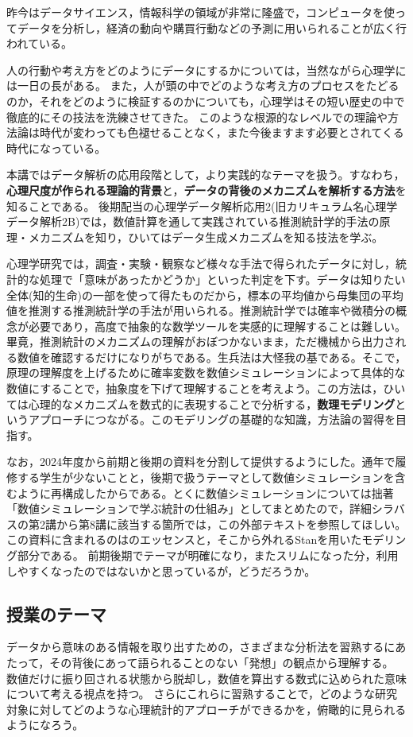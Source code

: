 昨今はデータサイエンス，情報科学の領域が非常に隆盛で，コンピュータを使ってデータを分析し，経済の動向や購買行動などの予測に用いられることが広く行われている。

人の行動や考え方をどのようにデータにするかについては，当然ながら心理学には一日の長がある。
また，人が頭の中でどのような考え方のプロセスをたどるのか，それをどのように検証するのかについても，心理学はその短い歴史の中で徹底的にその技法を洗練させてきた。
このような根源的なレベルでの理論や方法論は時代が変わっても色褪せることなく，また今後ますます必要とされてくる時代になっている。

本講ではデータ解析の応用段階として，より実践的なテーマを扱う。すなわち，\textbf{心理尺度が作られる理論的背景}と，\textbf{データの背後のメカニズムを解析する方法}を知ることである。
後期配当の心理学データ解析応用2(旧カリキュラム名心理学データ解析2B)では，数値計算を通して実践されている推測統計学的手法の原理・メカニズムを知り，ひいてはデータ生成メカニズムを知る技法を学ぶ。

心理学研究では，調査・実験・観察など様々な手法で得られたデータに対し，統計的な処理で「意味があったかどうか」といった判定を下す。データは知りたい全体(知的生命)の一部を使って得たものだから，標本の平均値から母集団の平均値を推測する推測統計学の手法が用いられる。推測統計学では確率や微積分の概念が必要であり，高度で抽象的な数学ツールを実感的に理解することは難しい。畢竟，推測統計のメカニズムの理解がおぼつかないまま，ただ機械から出力される数値を確認するだけになりがちである。生兵法は大怪我の基である。そこで，原理の理解度を上げるために確率変数を数値シミュレーションによって具体的な数値にすることで，抽象度を下げて理解することを考えよう。この方法は，ひいては心理的なメカニズムを数式的に表現することで分析する，\textbf{数理モデリング}というアプローチにつながる。このモデリングの基礎的な知識，方法論の習得を目指す。

なお，2024年度から前期と後期の資料を分割して提供するようにした。通年で履修する学生が少ないことと，後期で扱うテーマとして数値シミュレーションを含むように再構成したからである。とくに数値シミュレーションについては拙著「数値シミュレーションで学ぶ統計の仕組み」\parencite{kosugi2023}としてまとめたので，詳細シラバスの第2講から第8講に該当する箇所では，この外部テキストを参照してほしい。この資料に含まれるのは\textcite{kosugi2023}のエッセンスと，そこから外れるStanを用いたモデリング部分である。
前期後期でテーマが明確になり，またスリムになった分，利用しやすくなったのではないかと思っているが，どうだろうか。

\subsection*{授業のテーマ}
データから意味のある情報を取り出すための，さまざまな分析法を習熟するにあたって，その背後にあって語られることのない「発想」の観点から理解する。
数値だけに振り回される状態から脱却し，数値を算出する数式に込められた意味について考える視点を持つ。
さらにこれらに習熟することで，どのような研究対象に対してどのような心理統計的アプローチができるかを，俯瞰的に見られるようになろう。

